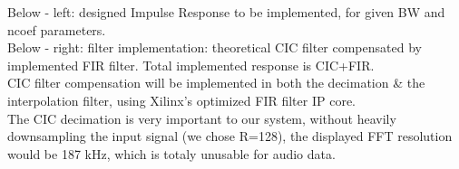\documentclass{article}
\begin{document}
Below - left: designed Impulse Response to be implemented,
for given BW and ncoef parameters. \\

Below - right: filter implementation: theoretical
CIC filter compensated by implemented FIR filter.
Total implemented response is CIC+FIR. \\

CIC filter compensation 
will be implemented in both the decimation
\& the interpolation filter, using
Xilinx's optimized FIR filter IP core. \\

The CIC decimation is very important
to our system, without heavily downsampling
the input signal (we chose R=128),
the displayed FFT resolution would be
187 kHz, which is totaly unusable for audio data. \\
\end{document}
